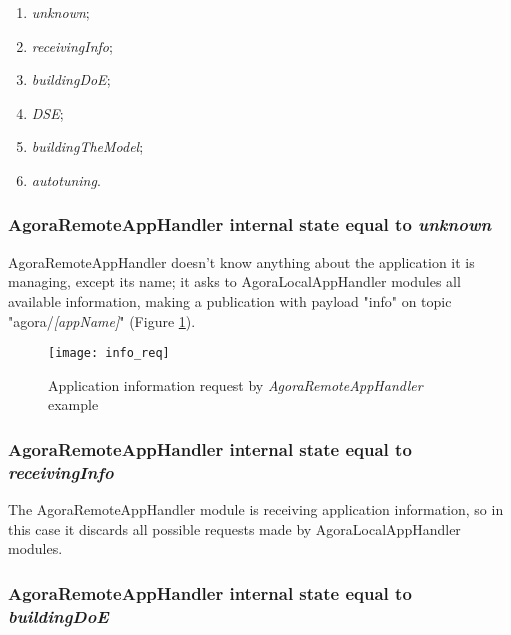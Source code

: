 \begin{enumerate}

    \item \textit{unknown};

    \item \textit{receivingInfo};

    \item \textit{buildingDoE};

    \item \textit{DSE};

    \item \textit{buildingTheModel};

    \item \textit{autotuning}.

\end{enumerate}


\subsubsection{AgoraRemoteAppHandler internal state equal to \textit{unknown}}\label{req_info}

AgoraRemoteAppHandler doesn't know anything about the application it is managing, except its name; it asks to AgoraLocalAppHandler modules all available information, making a publication with payload "info" on topic "agora/\textit{[appName]}" (Figure \ref{fig::remotInfoReq}).

\begin{figure}[ht]

    \centering
    \texttt{[image: info\_req]}
    \caption{Application information request by \textit{AgoraRemoteAppHandler} example}

    \label{fig::remotInfoReq}
    
\end{figure}


\subsubsection{AgoraRemoteAppHandler internal state equal to \textit{receivingInfo}}

The AgoraRemoteAppHandler module is receiving application information, so in this case it discards all possible requests made by AgoraLocalAppHandler modules.


\subsubsection{AgoraRemoteAppHandler internal state equal to \textit{buildingDoE}}

